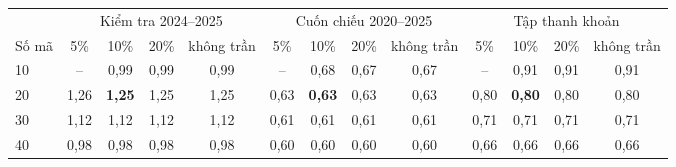\begin{tabular}{@{}lcccccccccccc@{}}
\toprule
 & \multicolumn{4}{c}{Kiểm tra 2024--2025} & \multicolumn{4}{c}{Cuốn chiếu 2020--2025} & \multicolumn{4}{c}{Tập thanh khoản} \\
\cmidrule(lr){2-5}\cmidrule(lr){6-9}\cmidrule(lr){10-13}
Số mã & 5\% & 10\% & 20\% & không trần & 5\% & 10\% & 20\% & không trần & 5\% & 10\% & 20\% & không trần \\
\midrule
10 & -- & 0{,}99 & 0{,}99 & 0{,}99 & -- & 0{,}68 & 0{,}67 & 0{,}67 & -- & 0{,}91 & 0{,}91 & 0{,}91 \\
20 & 1{,}26 & \textbf{1{,}25} & 1{,}25 & 1{,}25 & 0{,}63 & \textbf{0{,}63} & 0{,}63 & 0{,}63 & 0{,}80 & \textbf{0{,}80} & 0{,}80 & 0{,}80 \\
30 & 1{,}12 & 1{,}12 & 1{,}12 & 1{,}12 & 0{,}61 & 0{,}61 & 0{,}61 & 0{,}61 & 0{,}71 & 0{,}71 & 0{,}71 & 0{,}71 \\
40 & 0{,}98 & 0{,}98 & 0{,}98 & 0{,}98 & 0{,}60 & 0{,}60 & 0{,}60 & 0{,}60 & 0{,}66 & 0{,}66 & 0{,}66 & 0{,}66 \\
\bottomrule
\end{tabular}
